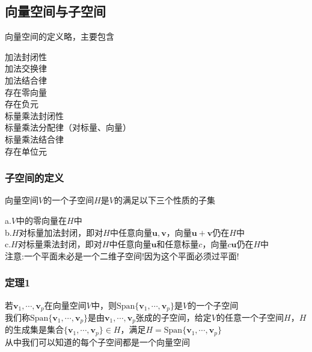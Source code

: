 \documentclass{article}
\newcommand{\ve}{\boldsymbol}
\newcommand{\spans}{\text{Span}}
\begin{document}
\begin{CJK}{UTF8}{gkai}
\subsection{向量空间与子空间}
向量空间的定义略，主要包含

加法封闭性 \\

加法交换律 \\

加法结合律 \\

存在零向量 \\

存在负元 \\

标量乘法封闭性 \\

标量乘法分配律（对标量、向量） \\

标量乘法结合律 \\

存在单位元 \\

\subsubsection{子空间的定义}
向量空间$V$的一个子空间$H$是$V$的满足以下三个性质的子集

a.$V$中的零向量在$H$中\\
b.$H$对标量加法封闭，即对$H$中任意向量$\ve{u},\ve{v}$，向量$\ve{u}+\ve{v}$仍在$H$中\\
c.$H$对标量乘法封闭，即对$H$中任意向量$\ve{u}$和任意标量$c$，向量$c\ve{u}$仍在$H$中\\

注意:一个平面未必是一个二维子空间!因为这个平面必须过平面!

\subsubsection{定理1}
若$\ve{v}_1,\cdots,\ve{v}_p$在向量空间$V$中，则$\spans\{\ve{v}_1,\cdots,\ve{v}_p\}$是$V$的一个子空间\\

我们称$\spans\{\ve{v}_1,\cdots,\ve{v}_p\}$是由$\ve{v}_1,\cdots,\ve{v}_p$张成的子空间，给定$V$的任意一个子空间$H$，$H$的生成集是集合$\{\ve{v}_1,\cdots,\ve{v}_p\}\in H$，满足$H=\spans\{\ve{v}_1,\cdots,\ve{v}_p\}$\\

从中我们可以知道的每个子空间都是一个向量空间\\

\end{CJK}
\end{document}
